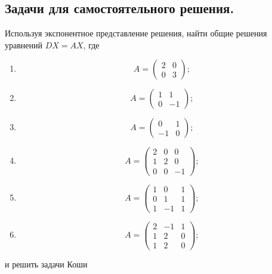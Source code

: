 \documentclass[a4paper, 12pt]{article}
\begin{document}
\subsection*{Задачи для самостоятельного решения.}
 Используя экспонентное представление решения, найти общие решения уравнений $DX = AX$, где\begin{enumerate}
 	\item $$A = \begin{pmatrix}
 		2 & 0\\
 		0 & 3
 	\end{pmatrix};$$
 \item $$A = \begin{pmatrix}
 	1 & 1\\
 	0 & -1
 \end{pmatrix};$$
\item $$A = \begin{pmatrix}
	0 & 1\\
	-1 & 0
\end{pmatrix};$$
\item $$A = \begin{pmatrix}
	2 & 0 & 0\\
	1 & 2 & 0\\
	0 & 0 & -1
\end{pmatrix};$$
\item $$A = \begin{pmatrix}
	1 & 0 & 1\\
	0 & 1 & 1\\
	1 & -1 & 1
\end{pmatrix};$$
\item $$A = \begin{pmatrix}
	2 & -1 & 1\\
	1 & 2 & 0\\
	1 & 2 & 0
\end{pmatrix};$$
\end{enumerate}
и решить задачи Коши
\end{document}
